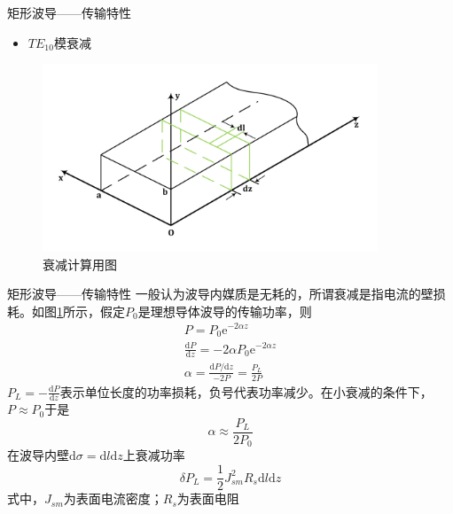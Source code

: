 \begin{frame}{矩形波导——传输特性}
    \begin{itemize}
        \item $TE_{10}$模衰减
    \end{itemize}
    \begin{figure}
        \includegraphics[width=10cm]{Cha6//fig6-9.pdf}
        \caption{衰减计算用图}
        \label{fig6-9}
    \end{figure}
\end{frame}

\begin{frame}{矩形波导——传输特性}
    一般认为波导内媒质是无耗的，所谓衰减是指电流的壁损耗。如图\ref{fig6-9}所示，假定$P_0$是理想导体波导的传输功率，则
    \begin{gather*}
        P=P_0\mathrm{e}^{-2\alpha z}\\
        \frac{\mathrm{d}P}{\mathrm{d}z}=-2\alpha P_0\mathrm{e}^{-2\alpha z}\\
        \alpha=\frac{\mathrm{d}P/\mathrm{d}z}{-2P}=\frac{P_L}{2P}
    \end{gather*}
    $P_L=-\frac{\mathrm{d}P}{\mathrm{d}z}$表示单位长度的功率损耗，负号代表功率减少。在小衰减的条件下，$P\approx P_0$于是
    $$\alpha\approx\frac{P_L}{2P_0}$$
    在波导内壁$\mathrm{d}\sigma=\mathrm{d}l\mathrm{d}z$上衰减功率
    $$\delta P_L=\frac{1}{2}J_{sm}^2R_s\mathrm{d}l\mathrm{d}z$$
    式中，$J_{sm}$为表面电流密度；$R_s$为表面电阻
\end{frame}

